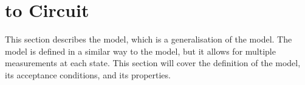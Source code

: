 \section{ to Circuit}
\label{sec:mmqfa}

This section describes the  model, which is a generalisation of the  model. The  model is defined in a similar way to the  model, but it allows for multiple measurements at each state. This section will cover the definition of the  model, its acceptance conditions, and its properties.
